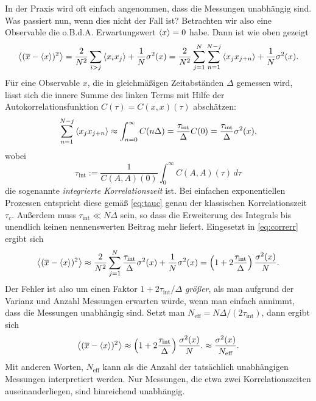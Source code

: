 In der Praxis wird oft einfach angenommen, dass die Messungen
unabhängig sind. Was passiert nun, wenn dies nicht der Fall ist?
Betrachten wir also eine Observable die o.B.d.A. Erwartungswert
$\left\langle{x}\right\rangle = 0$ habe. Dann ist wie oben gezeigt
\begin{equation}
  \label{eq:correrr}
  \left\langle{(\overline{x} - \left\langle{x}\right\rangle)^2}\right\rangle = \frac{2}{N^2}\sum_{i > j}
  \left\langle{x_ix_j}\right\rangle
  + \frac{1}{N}\sigma^2(x)
  = \frac{2}{N^2}\sum_{j=1}^{N}\sum_{n = 1}^{N-j} \left\langle{x_jx_{j+n}}\right\rangle
  + \frac{1}{N}\sigma^2(x).
\end{equation}
Für eine Observable $x$, die in gleichmäßigen Zeitabständen $\Delta$
gemessen wird, lässt sich die innere Summe des linken Terms mit Hilfe
der Autokorrelationsfunktion $C(\tau) = C(x,x)(\tau)$
abschätzen:\nobreak
\begin{equation}
  \sum_{n = 1}^{N-j} \left\langle{x_jx_{j+n}}\right\rangle
  \approx \int_{n = 0}^{\infty} C(n\Delta)
  = \frac{\tau_\text{int}}{\Delta} C(0)
  = \frac{\tau_\text{int}}{\Delta}\sigma^2(x),
\end{equation}
wobei
\begin{equation}
  \tau_\text{int} := \frac{1}{C(A,A)(0)}\int_0^\infty C(A,A)(\tau)\,d\tau
\end{equation}
die sogenannte \emph{integrierte
  Korrelationszeit}
ist. Bei einfachen exponentiellen Prozessen entspricht diese gemäß
\eqref{eq:tauc} genau der klassischen Korrelationszeit
$\tau_c$. Außerdem muss $\tau_\text{int}\ll N\Delta$ sein, so dass die
Erweiterung des Integrals bis unendlich keinen nennenswerten Beitrag
mehr liefert. Eingesetzt in \eqref{eq:correrr} ergibt sich
\begin{equation}
  \label{eq:correrrest}
  \left\langle{(\overline{x} - \left\langle{x}\right\rangle)^2}\right\rangle
  \approx
  \frac{2}{N^2}\sum_{j=1}^{N} \frac{\tau_\text{int}}{\Delta}\sigma^2(x)
  + \frac{1}{N}\sigma^2(x)
  =
  \left(1 + 2\frac{\tau_\text{int}}{\Delta}\right)\frac{\sigma^2(x)}{N}.
\end{equation}
Der Fehler ist also um einen Faktor $1 + 2 \tau_\text{int} /\Delta$
\emph{größer}, als man aufgrund der Varianz und Anzahl Messungen
erwarten würde, wenn man einfach annimmt, dass die Messungen
unabhängig sind. Setzt man $N_\text{eff} = N \Delta / (2\tau_\text{int})$, dann
ergibt sich
\begin{equation}
  \label{eq:errestvarcorr}
  \left\langle{(\overline{x} - \left\langle{x}\right\rangle)^2}\right\rangle
  \approx
  \left(1 + 2\frac{\tau_\text{int}}{\Delta}\right)\frac{\sigma^2(x)}{N}.
  \approx \frac{\sigma^2(x)}{N_\text{eff}}.
\end{equation}
Mit anderen Worten, $N_\text{eff}$ kann als die Anzahl der tatsächlich
unabhängigen Messungen interpretiert werden. Nur Messungen, die etwa
zwei Korrelationszeiten auseinanderliegen, sind hinreichend
unabhängig.

